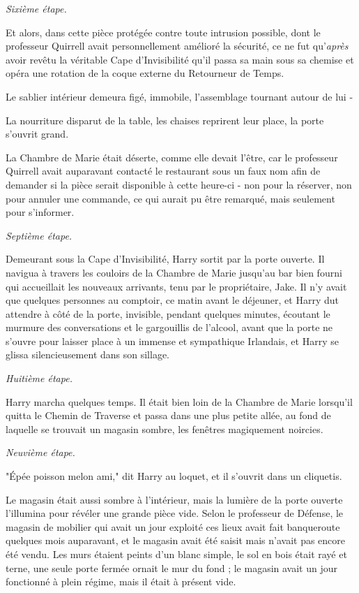 \emph{Sixième étape.} 

Et alors, dans cette pièce protégée contre toute intrusion possible, dont le professeur Quirrell avait personnellement amélioré la sécurité, ce ne fut qu'\emph{après}  avoir revêtu la véritable Cape d'Invisibilité qu'il passa sa main sous sa chemise et opéra une rotation de la coque externe du Retourneur de Temps.

Le sablier intérieur demeura figé, immobile, l'assemblage tournant autour de lui -

La nourriture disparut de la table, les chaises reprirent leur place, la porte s'ouvrit grand.

La Chambre de Marie était déserte, comme elle devait l'être, car le professeur Quirrell avait auparavant contacté le restaurant sous un faux nom afin de demander si la pièce serait disponible à cette heure-ci - non pour la réserver, non pour annuler une commande, ce qui aurait pu être remarqué, mais seulement pour s'informer.

\emph{Septième étape.} 

Demeurant sous la Cape d'Invisibilité, Harry sortit par la porte ouverte. Il navigua à travers les couloirs de la Chambre de Marie jusqu'au bar bien fourni qui accueillait les nouveaux arrivants, tenu par le propriétaire, Jake. Il n'y avait que quelques personnes au comptoir, ce matin avant le déjeuner, et Harry dut attendre à côté de la porte, invisible, pendant quelques minutes, écoutant le murmure des conversations et le gargouillis de l'alcool, avant que la porte ne s'ouvre pour laisser place à un immense et sympathique Irlandais, et Harry se glissa silencieusement dans son sillage.

\emph{Huitième étape.} 

Harry marcha quelques temps. Il était bien loin de la Chambre de Marie lorsqu'il quitta le Chemin de Traverse et passa dans une plus petite allée, au fond de laquelle se trouvait un magasin sombre, les fenêtres magiquement noircies.

\emph{Neuvième étape.} 

"Épée poisson melon ami," dit Harry au loquet, et il s'ouvrit dans un cliquetis.

Le magasin était aussi sombre à l'intérieur, mais la lumière de la porte ouverte l'illumina pour révéler une grande pièce vide. Selon le professeur de Défense, le magasin de mobilier qui avait un jour exploité ces lieux avait fait banqueroute quelques mois auparavant, et le magasin avait été saisit mais n'avait pas encore été vendu. Les murs étaient peints d'un blanc simple, le sol en bois était rayé et terne, une seule porte fermée ornait le mur du fond ; le magasin avait un jour fonctionné à plein régime, mais il était à présent vide.

